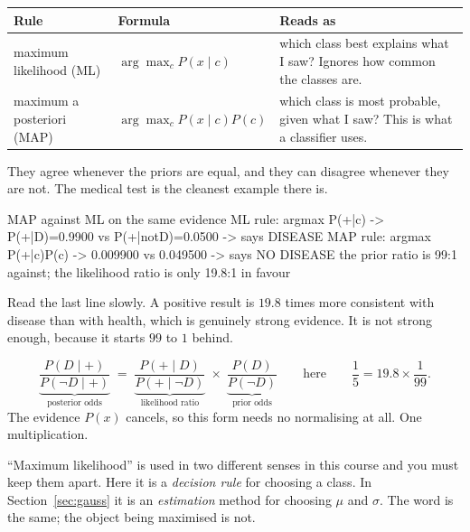 \documentclass[11pt]{article}
\begin{document}
\begin{center}\small
\begin{tabular}{@{}llp{7.6cm}@{}}
\toprule
\textbf{Rule} & \textbf{Formula} & \textbf{Reads as}\\
\midrule
maximum likelihood (ML) & $\arg\max_c P(x \mid c)$ &
  which class best explains what I saw? Ignores how common the classes are.\\
maximum a posteriori (MAP) & $\arg\max_c P(x \mid c) P(c)$ &
  which class is most probable, given what I saw? This is what a classifier
  uses.\\
\bottomrule
\end{tabular}
\end{center}

They agree whenever the priors are equal, and they can disagree whenever they
are not. The medical test is the cleanest example there is.

\begin{codeout}
MAP against ML on the same evidence
   ML  rule: argmax P(+|c)      -> P(+|D)=0.9900 vs P(+|notD)=0.0500  -> says DISEASE
   MAP rule: argmax P(+|c)P(c)  -> 0.009900 vs 0.049500  -> says NO DISEASE
   the prior ratio is 99:1 against; the likelihood ratio is only 19.8:1 in favour
\end{codeout}

Read the last line slowly. A positive result is $19.8$ times more consistent
with disease than with health, which is genuinely strong evidence. It is not
strong enough, because it starts $99$ to $1$ behind.

\begin{keyidea}
\[
  \underbrace{\frac{P(D \mid +)}{P(\lnot D \mid +)}}_{\text{posterior odds}}
  \;=\;
  \underbrace{\frac{P(+ \mid D)}{P(+ \mid \lnot D)}}_{\text{likelihood ratio}}
  \;\times\;
  \underbrace{\frac{P(D)}{P(\lnot D)}}_{\text{prior odds}}
  \qquad\text{here}\qquad
  \frac{1}{5} = 19.8 \times \frac{1}{99}.
\]
The evidence $P(x)$ cancels, so this form needs no normalising at all. One
multiplication.
\end{keyidea}

\begin{caution}
``Maximum likelihood'' is used in two different senses in this course and you
must keep them apart. Here it is a \emph{decision rule} for choosing a class.
In Section~\ref{sec:gauss} it is an \emph{estimation} method for choosing
$\mu$ and $\sigma$. The word is the same; the object being maximised is not.
\end{caution}
\end{document}
